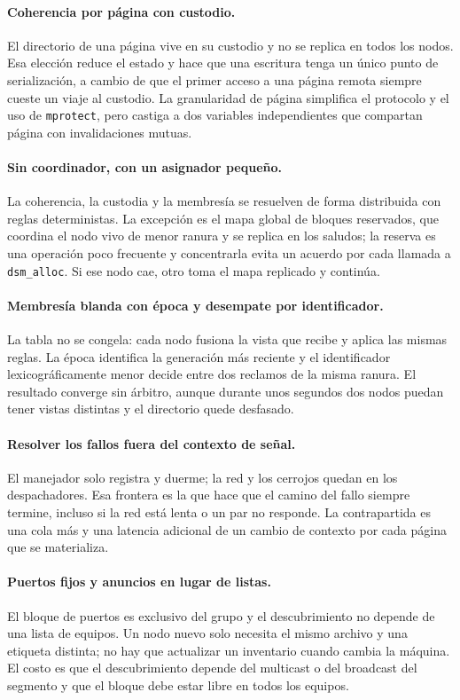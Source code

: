 \paragraph{Coherencia por página con custodio.} El directorio de una página vive en su custodio y no se replica en todos los nodos. Esa elección reduce el estado y hace que una escritura tenga un único punto de serialización, a cambio de que el primer acceso a una página remota siempre cueste un viaje al custodio. La granularidad de página simplifica el protocolo y el uso de \texttt{mprotect}, pero castiga a dos variables independientes que compartan página con invalidaciones mutuas.

\paragraph{Sin coordinador, con un asignador pequeño.} La coherencia, la custodia y la membresía se resuelven de forma distribuida con reglas deterministas. La excepción es el mapa global de bloques reservados, que coordina el nodo vivo de menor ranura y se replica en los saludos; la reserva es una operación poco frecuente y concentrarla evita un acuerdo por cada llamada a \texttt{dsm\_alloc}. Si ese nodo cae, otro toma el mapa replicado y continúa.

\paragraph{Membresía blanda con época y desempate por identificador.} La tabla no se congela: cada nodo fusiona la vista que recibe y aplica las mismas reglas. La época identifica la generación más reciente y el identificador lexicográficamente menor decide entre dos reclamos de la misma ranura. El resultado converge sin árbitro, aunque durante unos segundos dos nodos puedan tener vistas distintas y el directorio quede desfasado.

\paragraph{Resolver los fallos fuera del contexto de señal.} El manejador solo registra y duerme; la red y los cerrojos quedan en los despachadores. Esa frontera es la que hace que el camino del fallo siempre termine, incluso si la red está lenta o un par no responde. La contrapartida es una cola más y una latencia adicional de un cambio de contexto por cada página que se materializa.

\paragraph{Puertos fijos y anuncios en lugar de listas.} El bloque de puertos es exclusivo del grupo y el descubrimiento no depende de una lista de equipos. Un nodo nuevo solo necesita el mismo archivo y una etiqueta distinta; no hay que actualizar un inventario cuando cambia la máquina. El costo es que el descubrimiento depende del multicast o del broadcast del segmento y que el bloque debe estar libre en todos los equipos.

